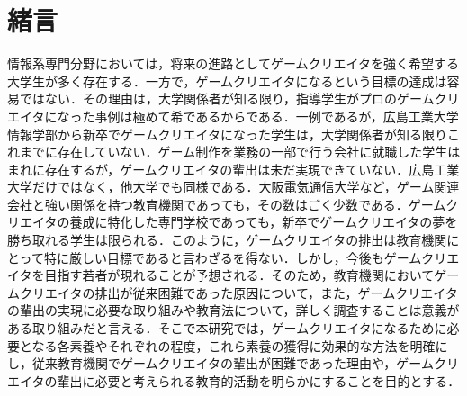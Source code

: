 \section{緒言}

情報系専門分野においては，将来の進路としてゲームクリエイタを強く希望する大学生が多く存在する．一方で，ゲームクリエイタになるという目標の達成は容易ではない．その理由は，大学関係者が知る限り，指導学生がプロのゲームクリエイタになった事例は極めて希であるからである．一例であるが，広島工業大学情報学部から新卒でゲームクリエイタになった学生は，大学関係者が知る限りこれまでに存在していない．ゲーム制作を業務の一部で行う会社に就職した学生はまれに存在するが，ゲームクリエイタの輩出は未だ実現できていない．広島工業大学だけではなく，他大学でも同様である．大阪電気通信大学など，ゲーム関連会社と強い関係を持つ教育機関であっても，その数はごく少数である．ゲームクリエイタの養成に特化した専門学校であっても，新卒でゲームクリエイタの夢を勝ち取れる学生は限られる．このように，ゲームクリエイタの排出は教育機関にとって特に厳しい目標であると言わざるを得ない．しかし，今後もゲームクリエイタを目指す若者が現れることが予想される．そのため，教育機関においてゲームクリエイタの排出が従来困難であった原因について，また，ゲームクリエイタの輩出の実現に必要な取り組みや教育法について，詳しく調査することは意義がある取り組みだと言える．そこで本研究では，ゲームクリエイタになるために必要となる各素養やそれぞれの程度，これら素養の獲得に効果的な方法を明確にし，従来教育機関でゲームクリエイタの輩出が困難であった理由や，ゲームクリエイタの輩出に必要と考えられる教育的活動を明らかにすることを目的とする．